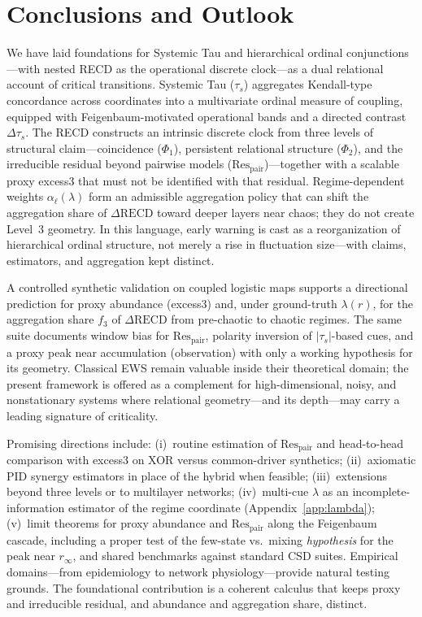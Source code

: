 \documentclass[11pt,a4paper]{article}
\begin{document}
\section{Conclusions and Outlook}
\label{sec:conclusions}

We have laid foundations for Systemic Tau and hierarchical ordinal
conjunctions---with nested RECD as the operational discrete clock---as a
dual relational account of critical transitions. Systemic Tau ($\tau_s$) aggregates Kendall-type concordance
across coordinates into a multivariate ordinal measure of coupling,
equipped with Feigenbaum-motivated operational bands and a directed
contrast $\Delta\tau_s$. The RECD constructs an intrinsic discrete clock
from three levels of structural claim---coincidence ($\Phi_1$),
persistent relational structure ($\Phi_2$), and the irreducible residual
beyond pairwise models ($\mathrm{Res}_{\mathrm{pair}}$)---together with a
scalable proxy excess3 that must not be identified with that residual.
Regime-dependent weights $\alpha_\ell(\lambda)$ form an admissible
aggregation policy that can shift the aggregation share of
$\Delta\mathrm{RECD}$ toward deeper layers near chaos; they do not
create Level~3 geometry. In this language, early warning is cast as a
reorganization of hierarchical ordinal structure, not merely a rise in
fluctuation size---with claims, estimators, and aggregation kept distinct.

A controlled synthetic validation on coupled logistic maps supports a
directional prediction for proxy abundance (excess3) and, under
ground-truth $\lambda(r)$, for the aggregation share $f_3$ of
$\Delta\mathrm{RECD}$ from pre-chaotic to chaotic regimes. The same suite
documents window bias for $\mathrm{Res}_{\mathrm{pair}}$, polarity
inversion of $|\tau_s|$-based cues, and a proxy peak near accumulation
(observation) with only a working hypothesis for its geometry. Classical
EWS remain valuable inside their theoretical domain; the present
framework is offered as a complement for high-dimensional, noisy, and
nonstationary systems where relational geometry---and its depth---may
carry a leading signature of criticality.

Promising directions include: (i)~routine estimation of
$\mathrm{Res}_{\mathrm{pair}}$ and head-to-head comparison with excess3 on
XOR versus common-driver synthetics; (ii)~axiomatic PID synergy
estimators in place of the hybrid when feasible; (iii)~extensions beyond
three levels or to multilayer networks; (iv)~multi-cue $\lambda$ as an
incomplete-information estimator of the regime coordinate
(Appendix~\ref{app:lambda}); (v)~limit theorems for proxy abundance and
$\mathrm{Res}_{\mathrm{pair}}$ along the Feigenbaum cascade, including a
proper test of the few-state vs.\ mixing \emph{hypothesis} for the peak
near $r_\infty$, and shared benchmarks against standard CSD suites.
Empirical domains---from epidemiology to network physiology---provide
natural testing grounds. The foundational contribution is a coherent
calculus that keeps proxy and irreducible residual, and abundance and
aggregation share, distinct.
\end{document}
